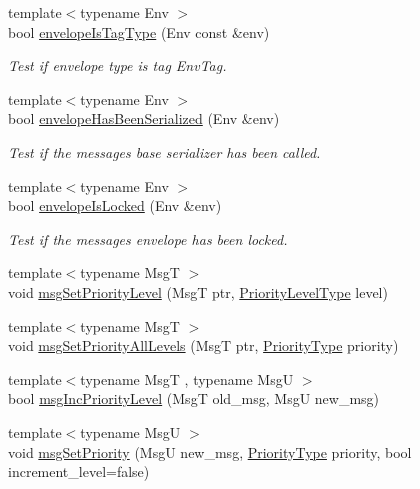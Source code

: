 \begin{DoxyCompactItemize}
{\footnotesize template$<$typename Env $>$ }\\bool \hyperlink{namespacevt_1_1messaging_a210f23c991eaf84274b744ac109ba72d}{envelope\+Is\+Tag\+Type} (Env const \&env)
\begin{DoxyCompactList}\small\item\em Test if envelope type is tag {\ttfamily Env\+Tag}. \end{DoxyCompactList}\item 
{\footnotesize template$<$typename Env $>$ }\\bool \hyperlink{namespacevt_1_1messaging_af984147f8c3e5bc9a34eb354ed2808d3}{envelope\+Has\+Been\+Serialized} (Env \&env)
\begin{DoxyCompactList}\small\item\em Test if the message\textquotesingle{}s base serializer has been called. \end{DoxyCompactList}\item 
{\footnotesize template$<$typename Env $>$ }\\bool \hyperlink{namespacevt_1_1messaging_a6129f4cbd5fd124f342d1235694f664d}{envelope\+Is\+Locked} (Env \&env)
\begin{DoxyCompactList}\small\item\em Test if the message\textquotesingle{}s envelope has been locked. \end{DoxyCompactList}\item 
{\footnotesize template$<$typename MsgT $>$ }\\void \hyperlink{namespacevt_1_1messaging_a5cca7f3fb7db0bfe14b3426ef9132090}{msg\+Set\+Priority\+Level} (MsgT ptr, \hyperlink{namespacevt_a53e07fdb3351b0f263e0dfd51b968d5e}{Priority\+Level\+Type} level)
\item 
{\footnotesize template$<$typename MsgT $>$ }\\void \hyperlink{namespacevt_1_1messaging_aae494e42c66a7b35346fd31d0100ebeb}{msg\+Set\+Priority\+All\+Levels} (MsgT ptr, \hyperlink{namespacevt_a86bff9f556eb761b27fc8600d006ac04}{Priority\+Type} priority)
\item 
{\footnotesize template$<$typename MsgT , typename MsgU $>$ }\\bool \hyperlink{namespacevt_1_1messaging_a6ee5ed1aac4e553185dc3fe80544ac2a}{msg\+Inc\+Priority\+Level} (MsgT old\+\_\+msg, MsgU new\+\_\+msg)
\item 
{\footnotesize template$<$typename MsgU $>$ }\\void \hyperlink{namespacevt_1_1messaging_ab8115ae64f9c390e7a92f3f02aea8454}{msg\+Set\+Priority} (MsgU new\+\_\+msg, \hyperlink{namespacevt_a86bff9f556eb761b27fc8600d006ac04}{Priority\+Type} priority, bool increment\+\_\+level=false)

\end{DoxyCompactItemize}
